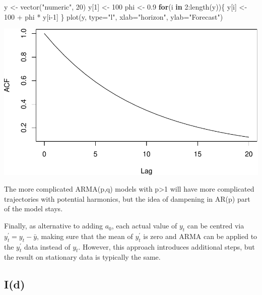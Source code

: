 \documentclass[
]{book}
\newenvironment{Shaded}{\begin{snugshade}}{\end{snugshade}}
\newcommand{\AttributeTok}[1]{\textcolor[rgb]{0.77,0.63,0.00}{#1}}
\newcommand{\ControlFlowTok}[1]{\textcolor[rgb]{0.13,0.29,0.53}{\textbf{#1}}}
\newcommand{\DecValTok}[1]{\textcolor[rgb]{0.00,0.00,0.81}{#1}}
\newcommand{\FloatTok}[1]{\textcolor[rgb]{0.00,0.00,0.81}{#1}}
\newcommand{\FunctionTok}[1]{\textcolor[rgb]{0.00,0.00,0.00}{#1}}
\newcommand{\NormalTok}[1]{#1}
\newcommand{\OtherTok}[1]{\textcolor[rgb]{0.56,0.35,0.01}{#1}}
\newcommand{\SpecialCharTok}[1]{\textcolor[rgb]{0.00,0.00,0.00}{#1}}
\newcommand{\StringTok}[1]{\textcolor[rgb]{0.31,0.60,0.02}{#1}}
\theoremstyle{definition}
\theoremstyle{definition}
\theoremstyle{definition}
\theoremstyle{definition}
\theoremstyle{remark}
\begin{document}
\begin{Shaded}
\begin{Highlighting}[]
\NormalTok{y }\OtherTok{\textless{}{-}} \FunctionTok{vector}\NormalTok{(}\StringTok{"numeric"}\NormalTok{, }\DecValTok{20}\NormalTok{)}
\NormalTok{y[}\DecValTok{1}\NormalTok{] }\OtherTok{\textless{}{-}} \DecValTok{100}
\NormalTok{phi }\OtherTok{\textless{}{-}} \FloatTok{0.9}
\ControlFlowTok{for}\NormalTok{(i }\ControlFlowTok{in} \DecValTok{2}\SpecialCharTok{:}\FunctionTok{length}\NormalTok{(y))\{}
\NormalTok{    y[i] }\OtherTok{\textless{}{-}} \DecValTok{100} \SpecialCharTok{+}\NormalTok{ phi }\SpecialCharTok{*}\NormalTok{ y[i}\DecValTok{{-}1}\NormalTok{]}
\NormalTok{\}}
\FunctionTok{plot}\NormalTok{(y, }\AttributeTok{type=}\StringTok{"l"}\NormalTok{, }\AttributeTok{xlab=}\StringTok{"horizon"}\NormalTok{, }\AttributeTok{ylab=}\StringTok{"Forecast"}\NormalTok{)}
\end{Highlighting}
\end{Shaded}

\includegraphics{adam_files/figure-latex/unnamed-chunk-48-1.pdf}

The more complicated ARMA(p,q) models with p\textgreater1 will have more complicated trajectories with potential harmonics, but the idea of dampening in AR(p) part of the model stays.

Finally, as alternative to adding \(a_0\), each actual value of \(y_t\) can be centred via \(y^\prime_t = y_t - \bar{y}\), making sure that the mean of \(y^\prime_t\) is zero and ARMA can be applied to the \(y^\prime_t\) data instead of \(y_t\). However, this approach introduces additional steps, but the result on stationary data is typically the same.

\hypertarget{Differences}{%
\subsection{I(d)}\label{Differences}}
\end{document}
